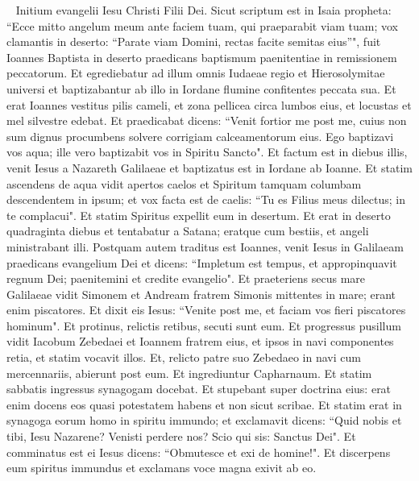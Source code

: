 
\begin{biblechapter}   
\verse Initium evangelii Iesu Christi Filii Dei. 
\verse Sicut scriptum est in Isaia propheta: “Ecce mitto angelum meum ante faciem tuam, qui praeparabit viam tuam; 
\verse vox clamantis in deserto: “Parate viam Domini, rectas facite semitas eius”", 
\verse fuit Ioannes Baptista in deserto praedicans baptismum paenitentiae in remissionem peccatorum. 
\verse Et egrediebatur ad illum omnis Iudaeae regio et Hierosolymitae universi et baptizabantur ab illo in Iordane flumine confitentes peccata sua. 
\verse Et erat Ioannes vestitus pilis cameli, et zona pellicea circa lumbos eius, et locustas et mel silvestre edebat. 
\verse Et praedicabat dicens: “Venit fortior me post me, cuius non sum dignus procumbens solvere corrigiam calceamentorum eius. 
\verse Ego baptizavi vos aqua; ille vero baptizabit vos in Spiritu Sancto". 
\verse Et factum est in diebus illis, venit Iesus a Nazareth Galilaeae et baptizatus est in Iordane ab Ioanne. 
\verse Et statim ascendens de aqua vidit apertos caelos et Spiritum tamquam columbam descendentem in ipsum; 
\verse et vox facta est de caelis: “Tu es Filius meus dilectus; in te complacui". 
\verse Et statim Spiritus expellit eum in desertum. 
\verse Et erat in deserto quadraginta diebus et tentabatur a Satana; eratque cum bestiis, et angeli ministrabant illi. 
\verse Postquam autem traditus est Ioannes, venit Iesus in Galilaeam praedicans evangelium Dei 
\verse et dicens: “Impletum est tempus, et appropinquavit regnum Dei; paenitemini et credite evangelio". 
\verse Et praeteriens secus mare Galilaeae vidit Simonem et Andream fratrem Simonis mittentes in mare; erant enim piscatores. 
\verse Et dixit eis Iesus: “Venite post me, et faciam vos fieri piscatores hominum". 
\verse Et protinus, relictis retibus, secuti sunt eum. 
\verse Et progressus pusillum vidit Iacobum Zebedaei et Ioannem fratrem eius, et ipsos in navi componentes retia, 
\verse et statim vocavit illos. Et, relicto patre suo Zebedaeo in navi cum mercennariis, abierunt post eum. 
\verse Et ingrediuntur Capharnaum. Et statim sabbatis ingressus synagogam docebat. 
\verse Et stupebant super doctrina eius: erat enim docens eos quasi potestatem habens et non sicut scribae. 
\verse Et statim erat in synagoga eorum homo in spiritu immundo; et exclamavit 
\verse dicens: “Quid nobis et tibi, Iesu Nazarene? Venisti perdere nos? Scio qui sis: Sanctus Dei". 
\verse Et comminatus est ei Iesus dicens: “Obmutesce et exi de homine!". 
\verse Et discerpens eum spiritus immundus et exclamans voce magna exivit ab eo. 

\end{biblechapter}
